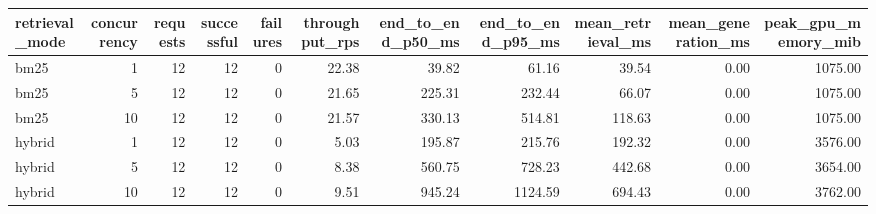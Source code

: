 \begin{tabular}{lrrrrrrrrrr}
\toprule
retrieval\_mode & concurrency & requests & successful & failures & throughput\_rps & end\_to\_end\_p50\_ms & end\_to\_end\_p95\_ms & mean\_retrieval\_ms & mean\_generation\_ms & peak\_gpu\_memory\_mib \\
\midrule
bm25 & 1 & 12 & 12 & 0 & 22.38 & 39.82 & 61.16 & 39.54 & 0.00 & 1075.00 \\
bm25 & 5 & 12 & 12 & 0 & 21.65 & 225.31 & 232.44 & 66.07 & 0.00 & 1075.00 \\
bm25 & 10 & 12 & 12 & 0 & 21.57 & 330.13 & 514.81 & 118.63 & 0.00 & 1075.00 \\
hybrid & 1 & 12 & 12 & 0 & 5.03 & 195.87 & 215.76 & 192.32 & 0.00 & 3576.00 \\
hybrid & 5 & 12 & 12 & 0 & 8.38 & 560.75 & 728.23 & 442.68 & 0.00 & 3654.00 \\
hybrid & 10 & 12 & 12 & 0 & 9.51 & 945.24 & 1124.59 & 694.43 & 0.00 & 3762.00 \\
\bottomrule
\end{tabular}
